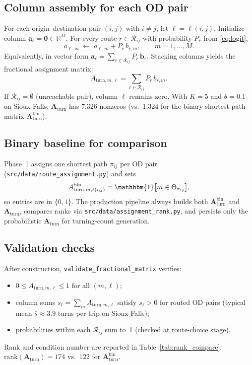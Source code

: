 \documentclass[11pt,a4paper]{report}
\newcommand{\Aturn}{\mathbf{A}_{\mathrm{turn}}}
\begin{document}
\subsection{Column assembly for each OD pair}
\label{sec:ch2-column-assembly}

For each origin--destination pair $(i,j)$ with $i\neq j$, let $\ell=\ell(i,j)$. Initialize column $\mathbf{a}_\ell=\mathbf{0}\in\mathbb{R}^M$. For every route $r\in\mathcal{R}_{ij}$ with probability $P_r$ from \eqref{eq:logit},
\begin{equation}
    a_{\ell,m} \;\leftarrow\; a_{\ell,m} + P_r\, b_{r,m},
    \qquad m=1,\ldots,M.
    \label{eq:column_update}
\end{equation}
Equivalently, in vector form $\mathbf{a}_\ell = \sum_{r\in\mathcal{R}_{ij}} P_r\,\mathbf{b}_r$. Stacking columns yields the fractional assignment matrix:
\begin{equation}
    A_{\mathrm{turn},m,\ell} = \sum_{r\in\mathcal{R}_{ij}} P_r\, b_{r,m}.
    \label{eq:fractional_A}
\end{equation}
If $\mathcal{R}_{ij}=\emptyset$ (unreachable pair), column $\ell$ remains zero. With $K=5$ and $\theta=0.1$ on Sioux Falls, $\Aturn$ has 7{,}326 nonzeros (vs.\ 1{,}324 for the binary shortest-path matrix $\Aturn^{\mathrm{bin}}$).


\subsection{Binary baseline for comparison}
\label{sec:ch2-binary-baseline}

Phase~1 assigns one shortest path $\pi_{ij}$ per OD pair (\texttt{src/data/route\_assignment.py}) and sets
\begin{equation}
    A^{\mathrm{bin}}_{\mathrm{turn},m,\ell(i,j)} = \mathbbm{1}\bigl[m\in\Theta_{\pi_{ij}}\bigr],
    \label{eq:binary_A}
\end{equation}
so entries are in $\{0,1\}$. The production pipeline always builds both $\Aturn^{\mathrm{bin}}$ and $\Aturn$, compares ranks via \texttt{src/data/assignment\_rank.py}, and persists only the probabilistic $\Aturn$ for turning-count generation.


\subsection{Validation checks}
\label{sec:ch2-aturn-validation}

After construction, \texttt{validate\_fractional\_matrix} verifies:
\begin{itemize}[nosep]
    \item $0 \le A_{\mathrm{turn},m,\ell} \le 1$ for all $(m,\ell)$;
    \item column sums $s_\ell=\sum_m A_{\mathrm{turn},m,\ell}$ satisfy $s_\ell>0$ for routed OD pairs (typical mean $\bar{s}\approx 3.9$ turns per trip on Sioux Falls);
    \item probabilities within each $\mathcal{R}_{ij}$ sum to~1 (checked at route-choice stage).
\end{itemize}
Rank and condition number are reported in Table~\ref{tab:rank_compare}; $\mathrm{rank}(\Aturn)=174$ vs.\ $122$ for $\Aturn^{\mathrm{bin}}$.
\end{document}
